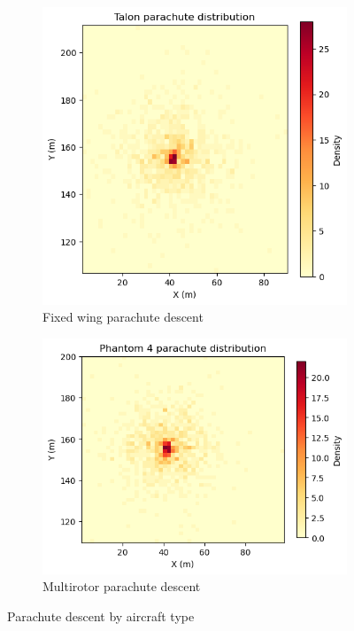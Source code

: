 \documentclass[12pt]{report}
\begin{document}
        \begin{figure}[H]
            \centering
            \begin{subfigure}[b]{0.45\textwidth}
                \centering
                \includegraphics[width=\textwidth]{Plot/talon/parachute.png}
                \caption{Fixed wing parachute descent}
                \label{fig:fixed_wing}
            \end{subfigure}
            \hfill
            \begin{subfigure}[b]{0.45\textwidth}
                \centering
                \includegraphics[width=\textwidth]{Plot/phantom4/parachute.png}
                \caption{Multirotor parachute descent}
                \label{fig:multirotor}
            \end{subfigure}
            \caption{Parachute descent by aircraft type}
            \label{fig:ballistic_descent}
        \end{figure}
\end{document}
